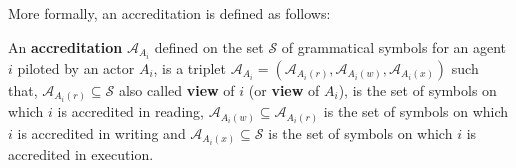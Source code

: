 \noindent More formally, an accreditation is defined as follows:

\begin{definition} \label{defSyllabaire}
	An \textbf{accreditation} $\mathcal{A}_{A_i}$ defined on the set $\mathcal{S}$ of grammatical symbols for an agent $i$ piloted by an actor $A_i$, is a triplet $\mathcal{A}_{A_i}=\left(\mathcal{A}_{A_i(r)},\mathcal{A}_{A_i(w)},\mathcal{A}_{A_i(x)}\right)$ such that, 
	$\mathcal{A}_{A_i(r)} \subseteq \mathcal{S}$ also called \textbf{view} of $i$ (or \textbf{view} of $A_i$), is the set of symbols on which $i$ is accredited in reading, 
	$\mathcal{A}_{A_i(w)} \subseteq \mathcal{A}_{A_i(r)}$ is the set of symbols on which $i$ is accredited in writing and  
	$\mathcal{A}_{A_i(x)} \subseteq \mathcal{S}$ is the set of symbols on which $i$ is accredited in execution.
\end{definition}



